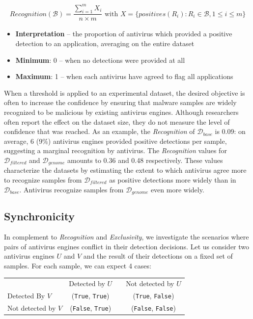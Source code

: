 \begin{mdframed}[hidealllines=true,nobreak=true]
\begin{gather*}
	Recognition(\mathcal{B}) = \dfrac{\sum^m_{i=1} X_i}{n \times m} \text{ with }
	X = \{positives(R_i) : R_i \in \mathcal{B}, 1 \leq i \leq m\}
\end{gather*}

\begin{itemize}
	\item{\textbf{Interpretation}} -- the proportion of antivirus which provided a positive detection to an application, averaging on the entire dataset
	\item{\textbf{Minimum}}: 0 -- when no detections were provided at all
	\item{\textbf{Maximum}}: 1 -- when each antivirus have agreed to flag all applications
\end{itemize}
\end{mdframed}

When a threshold is applied to an experimental dataset, the desired objective is often to increase the confidence by ensuring that malware samples are widely recognized to be malicious by existing antivirus engines.
Although researchers often report the effect on the dataset size, they do not measure the level of confidence that was reached.
As an example, the \emph{Recognition} of $\mathcal{D}_{base}$ is 0.09: on average, 6 (9\%) antivirus engines provided positive detections per sample, suggesting a marginal recognition by antivirus.
The \emph{Recognition} values for $\mathcal{D}_{filtered}$ and $\mathcal{D}_{genome}$ amounts to 0.36 and 0.48 respectively.
These values characterize the datasets by estimating the extent to which antivirus agree more to recognize samples from $\mathcal{D}_{filtered}$ as positive detections more widely than in $\mathcal{D}_{base}$.
Antivirus recognize samples from $\mathcal{D}_{genome}$ even more widely.
\subsection{Synchronicity}
In complement to \emph{Recognition} and \emph{Exclusivity}, we investigate the scenarios where pairs of antivirus engines conflict in their detection decisions.
Let us consider two antivirus engines $U$ and $V$ and the result of their detections on a fixed set of samples.
For each sample, we can expect 4 cases:

\newcommand{\myt}{\texttt{True}}
\newcommand{\myf}{\texttt{False}}
\begin{center}
	\begin{tabular}{lclc}
		                    & Detected by $U$ &  & Not detected by $U$ \\
		Detected By $V$     & (\myt, \myt)    &  & (\myt, \myf)        \\
		Not detected by $V$ & (\myf, \myt)    &  & (\myf, \myf)
	\end{tabular}%
\end{center}

